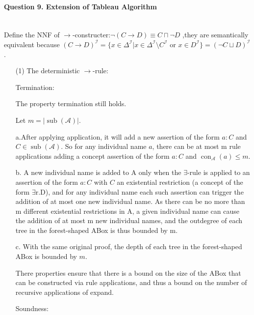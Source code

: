 \documentclass[12pt]{article}
\begin{document}
    \paragraph{Question 9. Extension of Tableau Algorithm}~{}
    \\

    Define the NNF of $\rightarrow$-constructer:$\lnot(C\rightarrow D) \equiv C\sqcap \lnot D$ ,they are semantically equivalent because $(C \to D)^{\mathcal{I}}  = \{ x \in \Delta^{\mathcal{I}} | x \in \Delta^{\mathcal{I}} \setminus C^{\mathcal{I}} \text{ or } x \in D^{\mathcal{I}} \}  = (\lnot C \sqcup D)^{\mathcal{I}}$.\par
    \begin{enumerate}
        \item[(1)] The deterministic $\rightarrow $-rule:\par
        Termination: \par 
        The property termination still holds. \par
        Let $m = |\operatorname{sub}(\mathcal{A})|$. \par
        a.After applying application, it will add a new assertion of the form $a: C$ and $C \in \operatorname{sub}(\mathcal{A})$. So for any individual name $a$, there can be at most m rule applications
        adding a concept assertion of the form $a : C$ and $\operatorname{con}_{\mathcal{A}}(a) \le m$.
        \par 
        b. A new individual name is added to A only when the $\exists$-rule is
        applied to an assertion of the form $a : C$ with $C$ an existential
        restriction (a concept of the form $\exists \text{r.D}$), and for any individual
        name each such assertion can trigger the addition of at most one
        new individual name. As there can be no more than m different
        existential restrictions in A, a given individual name can cause
        the addition of at most m new individual names, and the outdegree of each tree in the forest-shaped ABox is thus bounded by
        m.\par
        c. With the same original proof, the depth of each tree in the forest-shaped ABox is bounded by $m$.\par
        There properties ensure that there is a bound on the size of the ABox that can be constructed via
rule applications, and thus a bound on the number of recursive applications of expand. \par
        Soundness: \par

\end{enumerate}
\end{document}
